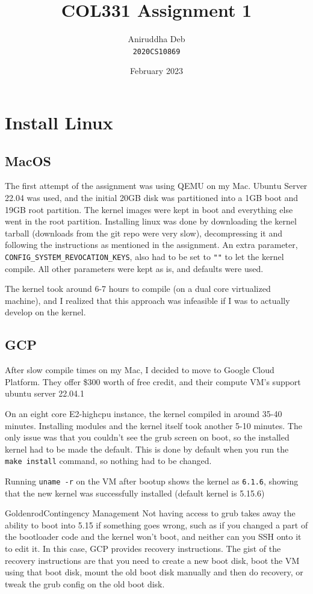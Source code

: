 \documentclass[12pt]{article}
\title{\textbf{COL331 Assignment 1}}
\author{Aniruddha Deb \\ \texttt{2020CS10869}}
\date{February 2023}
\begin{document}
\maketitle

\section{Install Linux}

\subsection{MacOS}

The first attempt of the assignment was using QEMU on my Mac. Ubuntu Server 
22.04 was used, and the initial 20GB disk was partitioned into a 1GB boot
and 19GB root partition. The kernel images were kept in boot and everything
else went in the root partition. Installing linux was done by downloading the
kernel tarball (downloads from the git repo were very slow), decompressing it
and following the instructions as mentioned in the assignment. An extra 
parameter, \texttt{CONFIG\_SYSTEM\_REVOCATION\_KEYS}, also had to be set to \texttt{""}
to let the kernel compile. All other parameters were kept as is, and defaults
were used.

The kernel took around 6-7 hours to compile (on a dual core virtualized machine),
and I realized that this approach was infeasible if I was to actually develop
on the kernel.

\subsection{GCP}

After slow compile times on my Mac, I decided to move to Google Cloud Platform.
They offer \$300 worth of free credit, and their compute VM's support ubuntu
server 22.04.1

On an eight core E2-highcpu instance, the kernel compiled in around 35-40
minutes. Installing modules and the kernel itself took another 5-10 minutes.
The only issue was that you couldn't see the grub screen on boot, so the 
installed kernel had to be made the default. This is done by default when you
run the \texttt{make install} command, so nothing had to be changed.

Running \texttt{uname -r} on the VM after bootup shows the kernel as \texttt{6.1.6},
showing that the new kernel was successfully installed (default kernel is 5.15.6)

\begin{mybox}{Goldenrod}{Contingency Management}
Not having access to grub takes away the ability to boot into 5.15 if something
goes wrong, such as if you changed a part of the bootloader code and the kernel
won't boot, and neither can you SSH onto it to edit it. In this case, GCP
provides recovery instructions. The gist of the recovery instructions are that
you need to create a new boot disk, boot the VM using that boot disk, mount the
old boot disk manually and then do recovery, or tweak the grub config on the
old boot disk.
\end{mybox}
\end{document}
